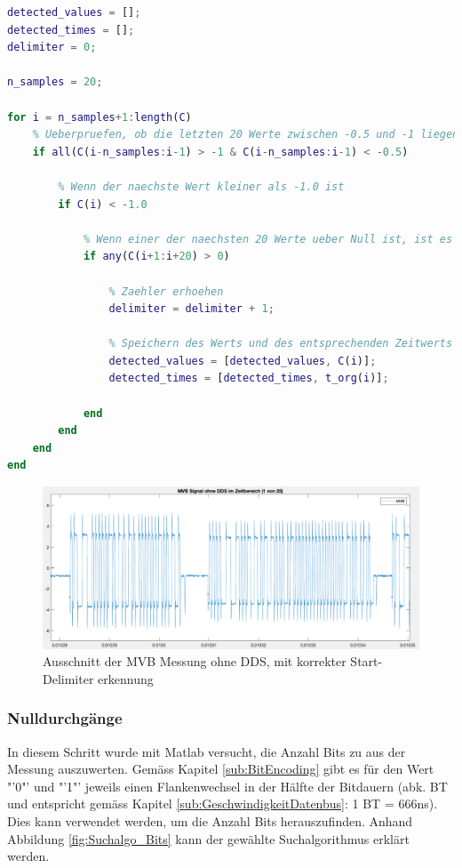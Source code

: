 \begin{lstlisting}[language=Matlab]
detected_values = [];
detected_times = [];
delimiter = 0;

n_samples = 20;

for i = n_samples+1:length(C)
    % Ueberpruefen, ob die letzten 20 Werte zwischen -0.5 und -1 liegen
    if all(C(i-n_samples:i-1) > -1 & C(i-n_samples:i-1) < -0.5)

        % Wenn der naechste Wert kleiner als -1.0 ist
        if C(i) < -1.0

            % Wenn einer der naechsten 20 Werte ueber Null ist, ist es ein Start Delimiter
            if any(C(i+1:i+20) > 0)
            
                % Zaehler erhoehen
                delimiter = delimiter + 1;
                    
                % Speichern des Werts und des entsprechenden Zeitwerts
                detected_values = [detected_values, C(i)];
                detected_times = [detected_times, t_org(i)];
                
            end
        end
    end
end
\end{lstlisting}

\begin{figure}[H]
    \centering
    \includegraphics[width=0.9\linewidth]{Figures/Chap3/Busauslastung/Ausschnitt_MVB_Delimiter_richtig.png}
    \caption{Ausschnitt der MVB Messung ohne DDS, mit korrekter Start-Delimiter erkennung}
    \label{fig:DelimiterRichtig}
\end{figure}


\subsubsection{Nulldurchgänge}
\label{subsub:Nulldurchgänge}
In diesem Schritt wurde mit Matlab versucht, die Anzahl Bits zu aus der Messung auszuwerten. Gemäss Kapitel \ref{sub:BitEncoding} gibt es für den Wert "'0"' und "'1"' jeweils einen Flankenwechsel in der Hälfte der Bitdauern (abk. BT und entspricht gemäss Kapitel \ref{sub:GeschwindigkeitDatenbus}: 1 BT = 666ns). Dies kann verwendet werden, um die Anzahl Bits herauszufinden. Anhand Abbildung \ref{fig:Suchalgo_Bits} kann der gewählte Suchalgorithmus erklärt werden.

